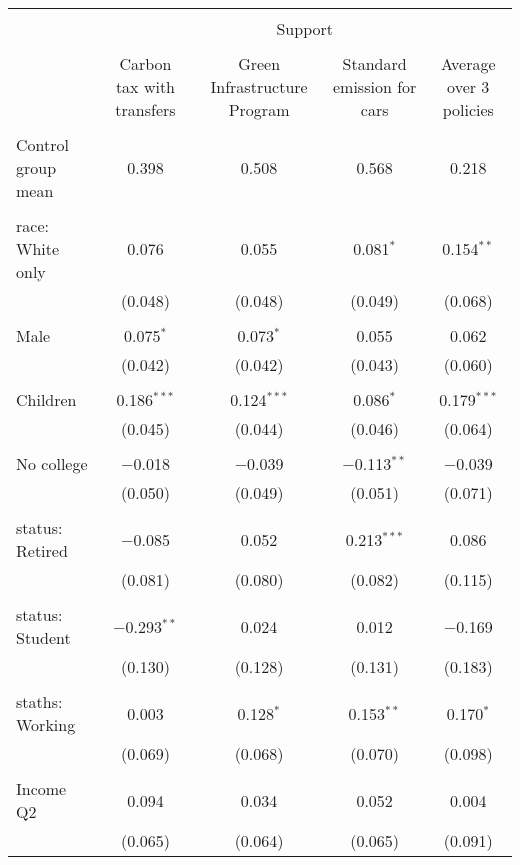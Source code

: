 
\begin{tabular}{@{\extracolsep{5pt}}lcccc} 
\\[-1.8ex]\hline 
\hline \\[-1.8ex] 
 & \multicolumn{4}{c}{Support} \\ 
\cline{2-5} 
\\[-1.8ex] & Carbon tax with transfers & Green Infrastructure Program & Standard emission for cars & Average over 3 policies \\ 
\hline \\[-1.8ex] 
 Control group mean & 0.398 & 0.508 & 0.568 & 0.218  \\ \hline \\[-1.8ex] race: White only & 0.076 & 0.055 & 0.081$^{*}$ & 0.154$^{**}$ \\ 
  & (0.048) & (0.048) & (0.049) & (0.068) \\ 
  & & & & \\ 
 Male & 0.075$^{*}$ & 0.073$^{*}$ & 0.055 & 0.062 \\ 
  & (0.042) & (0.042) & (0.043) & (0.060) \\ 
  & & & & \\ 
 Children & 0.186$^{***}$ & 0.124$^{***}$ & 0.086$^{*}$ & 0.179$^{***}$ \\ 
  & (0.045) & (0.044) & (0.046) & (0.064) \\ 
  & & & & \\ 
 No college & $-$0.018 & $-$0.039 & $-$0.113$^{**}$ & $-$0.039 \\ 
  & (0.050) & (0.049) & (0.051) & (0.071) \\ 
  & & & & \\ 
 status: Retired & $-$0.085 & 0.052 & 0.213$^{***}$ & 0.086 \\ 
  & (0.081) & (0.080) & (0.082) & (0.115) \\ 
  & & & & \\ 
 status: Student & $-$0.293$^{**}$ & 0.024 & 0.012 & $-$0.169 \\ 
  & (0.130) & (0.128) & (0.131) & (0.183) \\ 
  & & & & \\ 
 staths: Working & 0.003 & 0.128$^{*}$ & 0.153$^{**}$ & 0.170$^{*}$ \\ 
  & (0.069) & (0.068) & (0.070) & (0.098) \\ 
  & & & & \\ 
 Income Q2 & 0.094 & 0.034 & 0.052 & 0.004 \\ 
  & (0.065) & (0.064) & (0.065) & (0.091) \\ 

\end{tabular}
